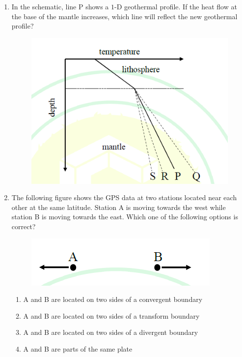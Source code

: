 \documentclass[journal,12pt,onecolumn]{IEEEtran}
\theoremstyle{remark}
\begin{document}
\begin{enumerate}
\item In the schematic, line P shows a $1$-D geothermal profile. If the heat flow at the base of the mantle increases, which line will reflect the new geothermal profile?
\begin{figure}[H]
    \centering
    \includegraphics[width=0.6\columnwidth]{figs/fig6.png}
    \caption{}
    \label{fig:q38}
\end{figure}
\hfill{}
\begin{enumerate}
\end{enumerate}

\item The following figure shows the GPS data at two stations located near each other at the same latitude. Station A is moving towards the west while station B is moving towards the east. Which one of the following options is correct?
\begin{figure}[H]
    \centering
    \includegraphics[width=0.5\columnwidth]{figs/fig7.png}
    \caption{}
    \label{fig:q39}
\end{figure}
\hfill{}
\begin{enumerate}
    \item A and B are located on two sides of a convergent boundary
    \item A and B are located on two sides of a transform boundary
    \item A and B are located on two sides of a divergent boundary
    \item A and B are parts of the same plate
\end{enumerate}


\end{enumerate}
\end{document}
